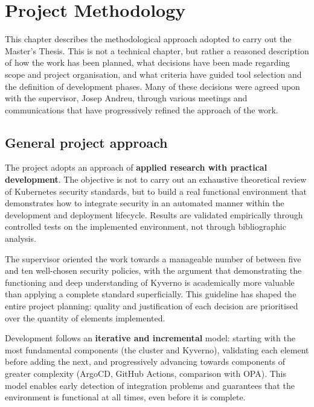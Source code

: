\chapter{Project Methodology}

This chapter describes the methodological approach adopted to carry out the Master's Thesis. This is not a technical chapter, but rather a reasoned description of how the work has been planned, what decisions have been made regarding scope and project organisation, and what criteria have guided tool selection and the definition of development phases. Many of these decisions were agreed upon with the supervisor, Josep Andreu, through various meetings and communications that have progressively refined the approach of the work.

\section{General project approach}

The project adopts an approach of \textbf{applied research with practical development}. The objective is not to carry out an exhaustive theoretical review of Kubernetes security standards, but to build a real functional environment that demonstrates how to integrate security in an automated manner within the development and deployment lifecycle. Results are validated empirically through controlled tests on the implemented environment, not through bibliographic analysis.

The supervisor oriented the work towards a manageable number of between five and ten well-chosen security policies, with the argument that demonstrating the functioning and deep understanding of Kyverno is academically more valuable than applying a complete standard superficially. This guideline has shaped the entire project planning: quality and justification of each decision are prioritised over the quantity of elements implemented.

Development follows an \textbf{iterative and incremental} model: starting with the most fundamental components (the cluster and Kyverno), validating each element before adding the next, and progressively advancing towards components of greater complexity (ArgoCD, GitHub Actions, comparison with OPA). This model enables early detection of integration problems and guarantees that the environment is functional at all times, even before it is complete.

